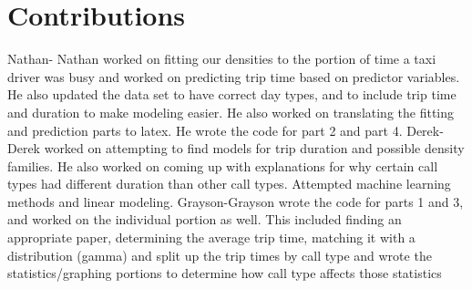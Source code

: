 \documentclass{article}
\begin{document}
\section{Contributions}
Nathan- Nathan worked on fitting our densities to the portion of time a taxi driver was busy and worked on predicting trip time based on predictor variables. He also updated the data set to have correct day types, and to include trip time and duration to make modeling easier. He also worked on translating the fitting and prediction parts to latex. He wrote the code for part 2 and part 4.
Derek-Derek worked on attempting to find models for trip duration and possible density families. He also worked on coming up with explanations for why certain call types had different duration than other call types. Attempted machine learning methods and linear modeling.
Grayson-Grayson wrote the code for parts 1 and 3, and worked on the individual portion as well. This included finding an appropriate paper, determining the average trip time, matching it with a distribution (gamma) and split up the trip times by call type and wrote the statistics/graphing  portions to determine how call type affects those statistics
\end{document}
